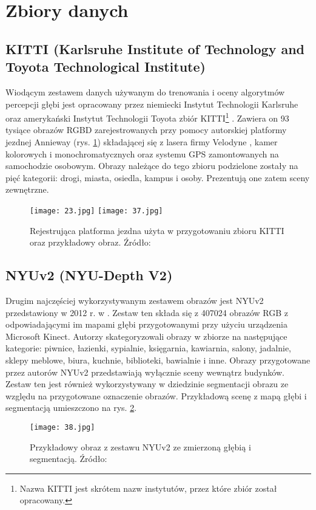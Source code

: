 \section{Zbiory danych}
\subsection{KITTI (Karlsruhe Institute of Technology and Toyota Technological Institute)}
Wiodącym zestawem danych używanym do trenowania i oceny algorytmów percepcji głębi jest opracowany przez niemiecki Instytut Technologii Karlsruhe oraz amerykański Instytut Technologii Toyota zbiór KITTI\footnote{Nazwa KITTI jest skrótem nazw instytutów, przez które zbiór został opracowany.} \cite{geiger2012}. Zawiera on 93 tysiące obrazów RGBD zarejestrowanych przy pomocy autorskiej platformy jezdnej Annieway (rys. \ref{fig:kitti-annieway-example}) składającej się z lasera firmy Velodyne \cite{Velodyne}, kamer kolorowych i monochromatycznych oraz systemu GPS zamontowanych na samochodzie osobowym. Obrazy należące do tego zbioru podzielone zostały na pięć kategorii: drogi, miasta, osiedla, kampus i osoby. Prezentują one zatem sceny zewnętrzne.
\begin{figure}[H]
    \centering
    \texttt{[image: 23.jpg]}
    \texttt{[image: 37.jpg]}
    \caption{Rejestrująca platforma jezdna użyta w przygotowaniu zbioru KITTI oraz przykładowy obraz. Źródło: \cite{geiger2012}}
    \label{fig:kitti-annieway-example}
\end{figure}

\subsection{NYUv2 (NYU-Depth V2)}
Drugim najczęściej wykorzystywanym zestawem obrazów jest NYUv2 przedstawiony w 2012 r. w \cite{couprie2013}. Zestaw ten składa się z 407024 obrazów RGB z odpowiadającymi im mapami głębi przygotowanymi przy użyciu urządzenia Microsoft Kinect. Autorzy skategoryzowali obrazy w zbiorze na następujące kategorie: piwnice, łazienki, sypialnie, księgarnia, kawiarnia, salony, jadalnie, sklepy meblowe, biura, kuchnie, biblioteki, bawialnie i inne. Obrazy przygotowane przez autorów NYUv2 przedstawiają wyłącznie sceny wewnątrz budynków. Zestaw ten jest również wykorzystywany w dziedzinie segmentacji obrazu ze względu na przygotowane oznaczenie obrazów. Przykładową scenę z mapą głębi i segmentacją umieszczono na rys. \ref{fig:nyuv2-example}.
\begin{figure}[H]
    \centering
    \texttt{[image: 38.jpg]}
    \caption{Przykładowy obraz z zestawu NYUv2 ze zmierzoną głębią i segmentacją. Źródło: \cite{couprie2013}}
    \label{fig:nyuv2-example}
\end{figure}


